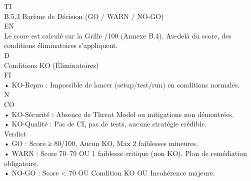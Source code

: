 \documentclass[12pt,landscape,a4paper]{article}
\begin{document}
\vspace{0.5em}
\vspace{0.5em}
\vspace{0.5em}
TI\\
B.5.3 Barème de Décision (GO / WARN / NO-GO)\\
\vspace{0.5em}
\vspace{0.5em}
\vspace{0.5em}
\vspace{0.5em}
EN\\
Le score est calculé sur la Grille /100 (Annexe B.4). Au-delà du score, des conditions éliminatoires s’appliquent.\\
\vspace{0.5em}
\vspace{0.5em}
\vspace{0.5em}
\vspace{0.5em}
D\\
Conditions KO (Éliminatoires)\\
\vspace{0.5em}
\vspace{0.5em}
\vspace{0.5em}
\vspace{0.5em}
FI\\
• KO-Repro : Impossible de lancer (setup/test/run) en conditions normales.\\
\vspace{0.5em}
N\\
CO\\
• KO-Sécurité : Absence de Threat Model ou mitigations non démontrées.\\
\vspace{0.5em}
• KO-Qualité : Pas de CI, pas de tests, aucune stratégie crédible.\\
\vspace{0.5em}
\vspace{0.5em}
Verdict\\
\vspace{0.5em}
• GO : Score ≥ 80/100, Aucun KO, Max 2 faiblesses mineures.\\
\vspace{0.5em}
• WARN : Score 70–79 OU 1 faiblesse critique (non KO). Plan de remédiation obligatoire.\\
\vspace{0.5em}
• NO-GO : Score \textless{} 70 OU Condition KO OU Incohérence majeure.\\
\vspace{0.5em}
\vspace{0.5em}
\end{document}
